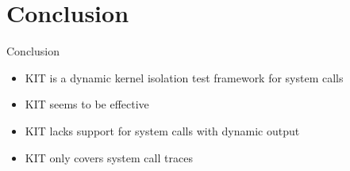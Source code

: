 \section{Conclusion}
\begin{frame}{Conclusion}{~}

\begin{itemize}
    \setlength\itemsep{1em}
    \item KIT is a dynamic kernel isolation test framework for system calls
    \item KIT seems to be effective
    \item KIT lacks support for system calls with dynamic output
    \item KIT only covers system call traces 
\end{itemize}


\end{frame}